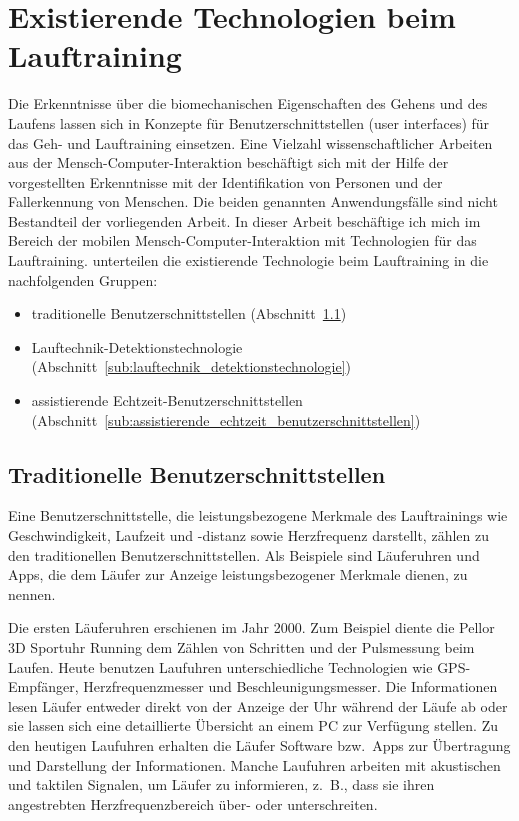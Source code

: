 

\section{Existierende Technologien beim Lauftraining} 

\label{sec:existierende_technologien_beim_lauftraining}

Die Erkenntnisse über die biomechanischen Eigenschaften des Gehens und des Laufens lassen sich in Konzepte für Benutzerschnittstellen (user interfaces) für das Geh- und Lauftraining einsetzen. Eine Vielzahl wissenschaftlicher Arbeiten aus der Mensch-Computer-Interaktion beschäftigt sich mit der Hilfe der vorgestellten Erkenntnisse mit der Identifikation von Personen und der Fallerkennung von Menschen. Die beiden genannten Anwendungsfälle sind nicht Bestandteil der vorliegenden Arbeit. In dieser Arbeit beschäftige ich mich im Bereich der mobilen Mensch-Computer-Interaktion mit Technologien für das Lauftraining. \citet{Jensen2014} unterteilen die existierende Technologie beim Lauftraining in die nachfolgenden Gruppen: 
\begin{itemize}
	\item traditionelle Benutzerschnittstellen (Abschnitt~\ref{sub:traditionelle_benutzerschnittstellen}) 
	\item Lauftechnik-Detektionstechnologie (Abschnitt~\ref{sub:lauftechnik_detektionstechnologie}) 
	\item assistierende Echtzeit-Benutzerschnittstellen (Abschnitt~\ref{sub:assistierende_echtzeit_benutzerschnittstellen}) 
\end{itemize}

\subsection{Traditionelle Benutzerschnittstellen} 

\label{sub:traditionelle_benutzerschnittstellen}

Eine Benutzerschnittstelle, die leistungsbezogene Merkmale des Lauftrainings wie Geschwindigkeit, Laufzeit und -distanz sowie Herzfrequenz darstellt, zählen \citet{Jensen2014} zu den traditionellen Benutzerschnittstellen. Als Beispiele sind Läuferuhren und Apps, die dem Läufer zur Anzeige leistungsbezogener Merkmale dienen, zu nennen.

Die ersten Läuferuhren erschienen im Jahr 2000. Zum Beispiel diente die Pellor 3D Sportuhr Running dem Zählen von Schritten und der Pulsmessung beim Laufen. Heute benutzen Laufuhren unterschiedliche Technologien wie \ac{GPS}-Empfänger, Herzfrequenzmesser und Beschleunigungsmesser. Die Informationen lesen Läufer entweder direkt von der Anzeige der Uhr während der Läufe ab oder sie lassen sich eine detaillierte Übersicht an einem PC zur Verfügung stellen. Zu den heutigen Laufuhren erhalten die Läufer Software bzw.\ Apps zur Übertragung und Darstellung der Informationen. Manche Laufuhren arbeiten mit akustischen und taktilen Signalen, um Läufer zu informieren, z.~B., dass sie ihren angestrebten Herzfrequenzbereich über- oder unterschreiten.


